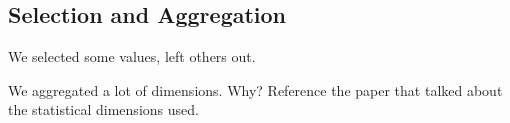 \subsection{Selection and Aggregation}
\label{sec:preprocessing_selection}
\label{sec:preprocessing_aggregation}

We selected some values, left others out.

We aggregated a lot of dimensions. Why? Reference the paper that talked about the statistical dimensions used.

